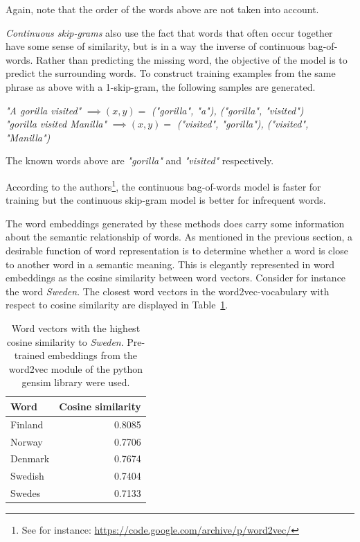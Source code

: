 Again, note that the order of the words above are not taken into account. 


\textit{Continuous skip-grams} also use the fact that words that often occur together have some sense of similarity, but is in a way the inverse of continuous bag-of-words. Rather than predicting the missing word, the objective of the model is to predict the surrounding words. To construct training examples from the same phrase as above with a 1-skip-gram, the following samples are generated. 

\begin{center}
\textit{"A gorilla visited"} $\implies (x,y) = $ \textit{("gorilla", "a"), ("gorilla", "visited")} \\ \vspace{1em}
\textit{"gorilla visited Manilla"} $\implies (x,y) = $ \textit{("visited", "gorilla"), ("visited", "Manilla")}
\end{center}

The known words above are \textit{"gorilla"} and \textit{"visited"} respectively. 

According to the authors\footnote{See for instance: \url{https://code.google.com/archive/p/word2vec/}}, the continuous bag-of-words model is faster for training but the continuous skip-gram model is better for infrequent words. 


The word embeddings generated by these methods does carry some information about the semantic relationship of words. As mentioned in the previous section, a desirable function of word representation is to determine whether a word is close to another word in a semantic meaning. This is elegantly represented in word embeddings as the cosine similarity between word vectors. Consider for instance the word \textit{Sweden}. The closest word vectors in the word2vec-vocabulary with respect to cosine similarity are displayed in Table~\ref{tab:cossim}.

\begin{table}[h!]
    \centering
    \begin{tabular}{lr}
    \hline
        \textbf{Word} & \textbf{Cosine similarity}  \\
        \hline \hline 
        Finland & 0.8085 \\
        Norway  & 0.7706 \\
        Denmark & 0.7674 \\
        Swedish & 0.7404 \\ 
        Swedes  & 0.7133 \\
        \hline 
    \end{tabular}
    \caption{Word vectors with the highest cosine similarity to \emph{Sweden}. Pre-trained embeddings from the word2vec module of the python gensim library were used.}
\label{tab:cossim}
\end{table}

